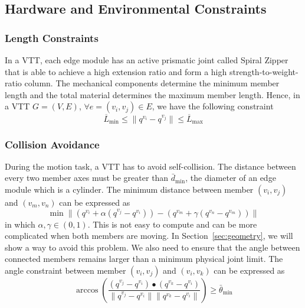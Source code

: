 \documentclass[journal]{IEEEtran}
\begin{document}
\subsection{Hardware and Environmental Constraints}
\label{sec:constraints}

\subsubsection{Length Constraints}
\label{sec:length}

In a VTT, each edge module has an active prismatic joint called Spiral
Zipper~\cite{Collins-spiral-zipper-icra-2016} that is able to achieve
a high extension ratio and form a high strength-to-weight-ratio
column. The mechanical components determine the minimum member length
and the total material determines the maximum member length. Hence, in
a VTT $G=(V, E)$, $\forall e=(v_i, v_j)\in E$, we have the following
constraint
\begin{equation}
  \label{eq:length-constraint}
  \overline{L}_{\mathrm{min}} \le \|q^{v_i} - q^{v_j}\| \le \overline{L}_{\mathrm{max}}
\end{equation}

\subsubsection{Collision Avoidance}
\label{sec:collision}

During the motion task, a VTT has to avoid self-collision. The
distance between every two member axes must be greater than
$\bar{d}_{\mathrm{min}}$, the diameter of an edge module which is a
cylinder. The minimum distance between member $(v_i, v_j)$ and
$(v_m, v_n)$ can be expressed as
\begin{equation}
  \label{eq:min-distance-edges}
  \min \|(q^{v_i} + \alpha(q^{v_j}-q^{v_i})) -
  (q^{v_m} + \gamma(q^{v_n}-q^{v_m}))\|
\end{equation}
in which $\alpha, \gamma \in (0, 1)$. This is not easy to compute and
can be more complicated when both members are moving. In
Section~\ref{sec:geometry}, we will show a way to avoid this
problem. We also need to ensure that the angle between connected
members remains larger than a minimum physical joint limit. The angle
constraint between member $(v_i, v_j)$ and $(v_i, v_k)$ can be
expressed as
\begin{equation}
  \label{eq:angle-constraint}
  \arccos\left(\frac{(q^{v_j}-q^{v_i})\bullet(q^{v_k}-q^{v_i})}{\|q^{v_j}-q^{v_i}\|\|q^{v_k}-q^{v_i}\|}\right)
  \ge \bar{\theta}_{\mathrm{min}}
\end{equation}
\end{document}
